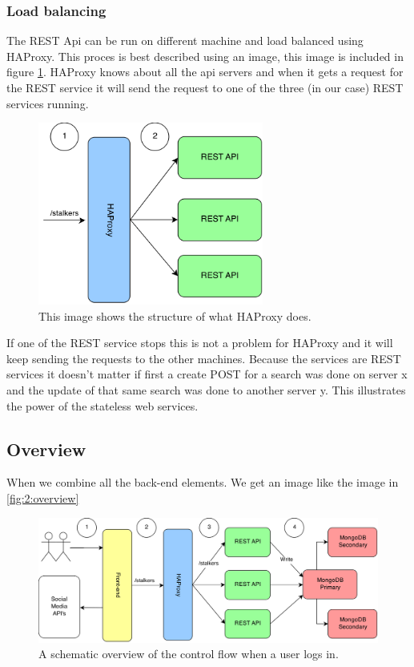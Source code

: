 \subsubsection{Load balancing}
\label{sssec:2:loadbalancing}
The REST Api can be run on different machine and load balanced using HAProxy. This proces is best described using an image, this image is included in figure \ref{fig:2:haproxy}. HAProxy knows about all the api servers and when it gets a request for the REST service it will send the request to one of the three (in our case) REST services running.

\begin{figure}
\centering
\includegraphics[height=6cm]{./img/haproxy}  
\caption{This image shows the structure of what HAProxy does.}
\label{fig:2:haproxy}
\end{figure}

If one of the REST service stops this is not a problem for HAProxy and it will keep sending the requests to the other machines. Because the services are REST services it doesn't matter if first a create POST for a search was done on server x and the update of that same search was done to another server y. This illustrates the power of the stateless web services.

\subsection{Overview}
When we combine all the back-end elements. We get an image like the image in \autoref{fig:2:overview}
\begin{figure}
\includegraphics[width=\textwidth]{./img/overview} 
\caption{A schematic overview of the control flow when a user logs in.}
\label{fig:2:overview}
\end{figure}
